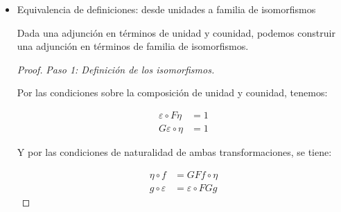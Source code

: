 \documentclass[11pt]{article}
\begin{document}
\begin{itemize}
\begin{itemize}
\begin{proof}
\emph{Paso 3: Comprobar la condición de composición.}

Por último tenemos los dos triángulos siguientes, cuya conmutatividad
equivale a la condición de que la composición debía ser la identidad.

\[\begin{tabular}{cc} \begin{tikzcd}
F \arrow{r}{F \eta_X} \arrow{dr}{id} & FGF \arrow{d}{\epsilon_{FX}} \\
 & F
\end{tikzcd} & \begin{tikzcd}
G \arrow{r}{\eta_{GX}} \arrow{dr}{id} & GFG \arrow{d}{G\epsilon_X} \\
 & G
\end{tikzcd}\end{tabular}
\]

Para ello usamos las identidades anteriores comprobando que:

\[\begin{aligned}
\epsilon \circ F\eta &= \varphi(\eta) = 1 \\
G\epsilon \circ \eta &= \varphi(\epsilon) = 1
\end{aligned}\]

$\quad$
\end{proof}

\item Equivalencia de definiciones: desde unidades a familia de isomorfismos
\label{sec-7-5-1-3-2}
\begin{theorem}
Dada una adjunción en términos de unidad y counidad, podemos construir
una adjunción en términos de familia de isomorfismos.
\end{theorem}

\begin{proof}
\emph{Paso 1: Definición de los isomorfismos.}

Por las condiciones sobre la composición de unidad y counidad,
tenemos:

\[\begin{aligned}
\varepsilon \circ F\eta &= 1 \\
G\varepsilon \circ \eta &= 1
\end{aligned}\]

Y por las condiciones de naturalidad de ambas transformaciones, se
tiene:

\[\begin{aligned}
\eta \circ f &= GFf \circ \eta \\
g \circ \varepsilon &= \varepsilon \circ FGg
\end{aligned}\]


\end{proof}
\end{itemize}
\end{itemize}
\end{document}
